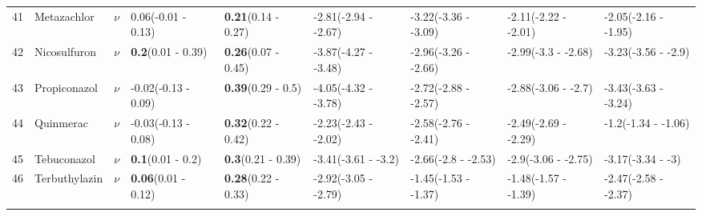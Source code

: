 \begin{longtable}{lp{2cm}p{0.6cm}p{1.8cm}p{1.8cm}p{1.8cm}p{1.8cm}p{1.8cm}p{1.8cm}}
  41 & Metazachlor & $\nu$ & 0.06\newline (-0.01 - 0.13) & \textbf{0.21}\newline (0.14 - 0.27) & -2.81\newline (-2.94 - -2.67) & -3.22\newline (-3.36 - -3.09) & -2.11\newline (-2.22 - -2.01) & -2.05\newline (-2.16 - -1.95) \\ 
  42 & Nicosulfuron & $\nu$ & \textbf{0.2}\newline (0.01 - 0.39) & \textbf{0.26}\newline (0.07 - 0.45) & -3.87\newline (-4.27 - -3.48) & -2.96\newline (-3.26 - -2.66) & -2.99\newline (-3.3 - -2.68) & -3.23\newline (-3.56 - -2.9) \\ 
  43 & Propiconazol & $\nu$ & -0.02\newline (-0.13 - 0.09) & \textbf{0.39}\newline (0.29 - 0.5) & -4.05\newline (-4.32 - -3.78) & -2.72\newline (-2.88 - -2.57) & -2.88\newline (-3.06 - -2.7) & -3.43\newline (-3.63 - -3.24) \\ 
  44 & Quinmerac & $\nu$ & -0.03\newline (-0.13 - 0.08) & \textbf{0.32}\newline (0.22 - 0.42) & -2.23\newline (-2.43 - -2.02) & -2.58\newline (-2.76 - -2.41) & -2.49\newline (-2.69 - -2.29) & -1.2\newline (-1.34 - -1.06) \\ 
  45 & Tebuconazol & $\nu$ & \textbf{0.1}\newline (0.01 - 0.2) & \textbf{0.3}\newline (0.21 - 0.39) & -3.41\newline (-3.61 - -3.2) & -2.66\newline (-2.8 - -2.53) & -2.9\newline (-3.06 - -2.75) & -3.17\newline (-3.34 - -3) \\ 
  46 & Terbuthylazin & $\nu$ & \textbf{0.06}\newline (0.01 - 0.12) & \textbf{0.28}\newline (0.22 - 0.33) & -2.92\newline (-3.05 - -2.79) & -1.45\newline (-1.53 - -1.37) & -1.48\newline (-1.57 - -1.39) & -2.47\newline (-2.58 - -2.37) \\ 
   \bottomrule
\label{tab:var_model_coef}
\end{longtable}
\endgroup
